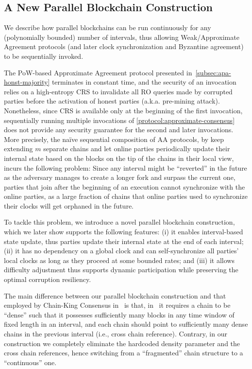 \subsection{A New Parallel Blockchain Construction}
\label{subsec:new-parallel-blockchain}

We describe how parallel blockchains can be run continuously for any (polynomially bounded) number of intervals, thus allowing Weak/Approximate Agreement protocols (and later clock synchronization and Byzantine agreement) to be sequentially invoked.

The PoW-based Approximate Agreement protocol presented in~\cref{subsec:apa-honst-majority} terminates in constant time, and the security of an invocation relies on a high-entropy CRS to invalidate all RO queries made by corrupted parties before the activation of honest parties (a.k.a. pre-mining attack).
%
Nonetheless, since CRS is available only at the beginning of the first invocation, sequentially running multiple invocations of \cref{protocol:approximate-consensus} does not provide any security guarantee for the second and later invocations.
%
More precisely, the na\"ive sequential composition of AA protocols, by keep extending $m$ separate chains and let online parties periodically update their internal state based on the blocks on the tip of the chains in their local view, incurs the following problem:
%
Since any interval might be ``reverted'' in the future as the adversary manages to create a longer fork and surpass the current one, parties that join after the beginning of an execution cannot synchronize with the online parties, as a large fraction of chains that online parties used to synchronize their clocks will get orphaned in the future.

To tackle this problem, we introduce a novel parallel blockchain construction, which we later show supports the following features:
%
(i) it enables interval-based state update, thus parties update their internal state at the end of each interval;
%
(ii) it has no dependency on a global clock and can self-synchronize all parties' local clocks as long as they proceed at some bounded rates;
%
and (iii) it allows difficulty adjustment thus supports dynamic participation while preserving the optimal corruption resiliency.

The main difference between our parallel blockchain construction and that employed by Chain-King Consensus in~\cite{EC:GarKiaShe24} is that, in~\cite{EC:GarKiaShe24} it requires a chain to be ``dense'' such that it possesses sufficiently many blocks in any time window of fixed length in an interval, and each chain should point to sufficiently many dense chains in the previous interval (i.e., cross chain reference).
%
Contrary, in our construction we completely eliminate the hardcoded density parameter and the cross chain references, hence switching from a ``fragmented'' chain structure to a ``continuous'' one.

